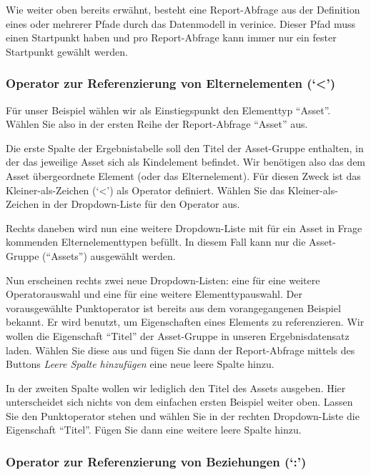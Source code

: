 \documentclass[a4paper,10pt]{book}
\begin{document}
Wie weiter oben bereits erwähnt, besteht eine Report-Abfrage aus der Definition
eines oder mehrerer Pfade durch das Datenmodell in verinice. Dieser Pfad muss
einen Startpunkt haben und pro Report-Abfrage kann immer nur ein fester
Startpunkt gewählt werden.

\subsubsection{\texorpdfstring{Operator zur Referenzierung von Elternelementen
(`\textless{}')}{Operator zur Referenzierung von Elternelementen (\textless{})}}\label{operator-zur-referenzierung-von-elternelementen}

Für unser Beispiel wählen wir als Einstiegspunkt den Elementtyp ``Asset''.
Wählen Sie also in der ersten Reihe der Report-Abfrage ``Asset'' aus.

Die erste Spalte der Ergebnistabelle soll den Titel der Asset-Gruppe enthalten,
in der das jeweilige Asset sich als Kindelement befindet. Wir benötigen also das
dem Asset übergeordnete Element (oder das Elternelement). Für diesen Zweck ist
das Kleiner-als-Zeichen (`\textless{}') als Operator definiert. Wählen Sie das
Kleiner-als-Zeichen in der Dropdown-Liste für den Operator aus.

Rechts daneben wird nun eine weitere Dropdown-Liste mit für ein Asset in Frage
kommenden Elternelementtypen befüllt. In diesem Fall kann nur die Asset-Gruppe
(``Assets'') ausgewählt werden.

Nun erscheinen rechts zwei neue Dropdown-Listen: eine für eine weitere
Operatorauswahl und eine für eine weitere Elementtypauswahl. Der vorausgewählte
Punktoperator ist bereits aus dem vorangegangenen Beispiel bekannt. Er wird
benutzt, um Eigenschaften eines Elements zu referenzieren. Wir wollen die
Eigenschaft ``Titel'' der Asset-Gruppe in unseren Ergebnisdatensatz laden.
Wählen Sie diese aus und fügen Sie dann der Report-Abfrage mittels des Buttons
\emph{Leere Spalte hinzufügen} eine neue leere Spalte hinzu.

In der zweiten Spalte wollen wir lediglich den Titel des Assets ausgeben. Hier
unterscheidet sich nichts von dem einfachen ersten Beispiel weiter oben. Lassen
Sie den Punktoperator stehen und wählen Sie in der rechten Dropdown-Liste die
Eigenschaft ``Titel''. Fügen Sie dann eine weitere leere Spalte hinzu.

\subsubsection{\texorpdfstring{Operator zur Referenzierung von Beziehungen
(`:')}{Operator zur Referenzierung von Beziehungen (:)}}\label{operator-zur-referenzierung-von-beziehungen}
\end{document}
